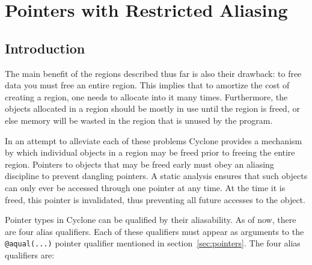 \section{Pointers with Restricted Aliasing}
\label{sec:aliasfree}

\subsection{Introduction}

The main benefit of the regions described thus far is also their
drawback: to free data you must free an entire region.  This implies
that to amortize the cost of creating a region, one needs to allocate
into it many times.  Furthermore, the objects allocated in a region
should be mostly in use until the region is freed, or else memory will
be wasted in the region that is unused by the program.

In an attempt to alleviate each of these problems Cyclone provides a
mechanism by which individual objects in a region may be freed prior
to freeing the entire region. Pointers to objects that may be freed
early must obey an aliasing discipline to prevent dangling pointers. A
static analysis ensures that such objects can only ever be accessed
through one pointer at any time. At the time it is freed, this pointer
is invalidated, thus preventing all future accesses to the object.

Pointer types in Cyclone can be qualified by their aliasability. As of
now, there are four alias qualifiers. Each of these qualifiers must
appear as arguments to the {\tt @aqual(...)} pointer qualifier
mentioned in section~\ref{sec:pointers}. The four alias qualifiers are:

